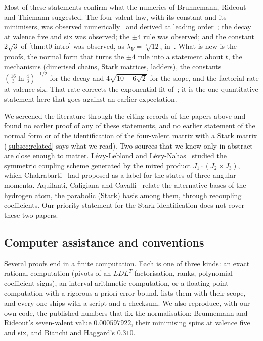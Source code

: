 Most of these statements confirm what the numerics of Brunnemann, Rideout and
Thiemann suggested. The four-valent law, with its constant and its minimisers, was
observed numerically~\cite{BT2006} and derived at leading order~\cite{BR2008a}; the
decay at valence five and six was observed; the $\pm4$ rule was observed; and the
constant $2\sqrt3$ of \cref{thm:t0-intro} was observed, as $\lambda_V=\sqrt[4]{12}$,
in~\cite[p.~35]{BR2010}. What is new is the proofs, the normal form that turns the
$\pm4$ rule into a statement about $t$, the mechanisms (dimerised chains, Stark
matrices, ladders), the constants $(\frac{16}3\ln\frac43)^{-1/2}$ for the decay and
$4\sqrt{10-6\sqrt2}$ for the slope, and the factorial rate at valence six. That rate
corrects the exponential fit of~\cite{BR2008b}; it is the one quantitative statement
here that goes against an earlier expectation.

We screened the literature through the citing records of the papers above and found
no earlier proof of any of these statements, and no earlier statement of the normal
form or of the identification of the four-valent matrix with a Stark matrix
(\cref{subsec:related} says what we read). Two sources that we know only in abstract
are close enough to matter. L\'evy-Leblond and L\'evy-Nahas~\cite{LLLN1965} studied the
symmetric coupling scheme generated by the mixed product $J_1\cdot(J_2\times J_3)$,
which Chakrabarti~\cite{Chakrabarti1964} had proposed as a label for the states of three
angular momenta. Aquilanti, Caligiana and Cavalli~\cite{ACC2003} relate the alternative
bases of the hydrogen atom, the parabolic (Stark) basis among them, through recoupling
coefficients. Our priority statement for the Stark identification does not cover these
two papers.

\subsection{Computer assistance and conventions}

Several proofs end in a finite computation. Each is one of three kinds: an exact
rational computation (pivots of an $LDL^T$ factorisation, ranks, polynomial
coefficient signs), an interval-arithmetic computation, or a floating-point
computation with a rigorous a priori error bound.  lists them
with their scope, and every one ships with a script and a checksum. We also
reproduce, with our own code, the published numbers that fix the normalisation:
Brunnemann and Rideout's seven-valent value $0.000597922$, their minimising spins at
valence five and six, and Bianchi and Haggard's $0.310$.

